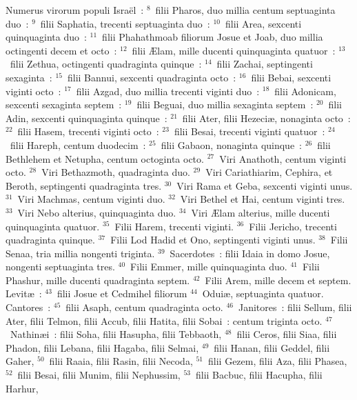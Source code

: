  Numerus virorum populi Isra\"el~:
${}^{8}$~filii Pharos, duo millia centum septuaginta duo~:
${}^{9}$~filii Saphatia, trecenti septuaginta duo~:
${}^{10}$~filii Area, sexcenti quinquaginta duo~:
${}^{11}$~filii Phahathmoab filiorum Josue et Joab, duo millia octingenti decem et octo~:
${}^{12}$~filii \AE lam, mille ducenti quinquaginta quatuor~:
${}^{13}$~filii Zethua, octingenti quadraginta quinque~:
${}^{14}$~filii Zachai, septingenti sexaginta~:
${}^{15}$~filii Bannui, sexcenti quadraginta octo~:
${}^{16}$~filii Bebai, sexcenti viginti octo~:
${}^{17}$~filii Azgad, duo millia trecenti viginti duo~:
${}^{18}$~filii Adonicam, sexcenti sexaginta septem~:
${}^{19}$~filii Beguai, duo millia sexaginta septem~:
${}^{20}$~filii Adin, sexcenti quinquaginta quinque~:
${}^{21}$~filii Ater, filii Hezeci\ae , nonaginta octo~:
${}^{22}$~filii Hasem, trecenti viginti octo~:
${}^{23}$~filii Besai, trecenti viginti quatuor~:
${}^{24}$~filii Hareph, centum duodecim~:
${}^{25}$~filii Gabaon, nonaginta quinque~:
${}^{26}$~filii Bethlehem et Netupha, centum octoginta octo.
${}^{27}$~Viri Anathoth, centum viginti octo.
${}^{28}$~Viri Bethazmoth, quadraginta duo.
${}^{29}$~Viri Cariathiarim, Cephira, et Beroth, septingenti quadraginta tres.
${}^{30}$~Viri Rama et Geba, sexcenti viginti unus.
${}^{31}$~Viri Machmas, centum viginti duo.
${}^{32}$~Viri Bethel et Hai, centum viginti tres.
${}^{33}$~Viri Nebo alterius, quinquaginta duo.
${}^{34}$~Viri \AE lam alterius, mille ducenti quinquaginta quatuor.
${}^{35}$~Filii Harem, trecenti viginti.
${}^{36}$~Filii Jericho, trecenti quadraginta quinque.
${}^{37}$~Filii Lod Hadid et Ono, septingenti viginti unus.
${}^{38}$~Filii Senaa, tria millia nongenti triginta.
${}^{39}$~Sacerdotes~: filii Idaia in domo Josue, nongenti septuaginta tres.
${}^{40}$~Filii Emmer, mille quinquaginta duo.
${}^{41}$~Filii Phashur, mille ducenti quadraginta septem.
${}^{42}$~Filii Arem, mille decem et septem. Levit\ae~:
${}^{43}$~filii Josue et Cedmihel filiorum
${}^{44}$~Odui\ae , septuaginta quatuor. Cantores~:
${}^{45}$~filii Asaph, centum quadraginta octo.
${}^{46}$~Janitores~: filii Sellum, filii Ater, filii Telmon, filii Accub, filii Hatita, filii Sobai~: centum triginta octo.
${}^{47}$~Nathin\ae i~: filii Soha, filii Hasupha, filii Tebbaoth,
${}^{48}$~filii Ceros, filii Siaa, filii Phadon, filii Lebana, filii Hagaba, filii Selmai,
${}^{49}$~filii Hanan, filii Geddel, filii Gaher,
${}^{50}$~filii Raaia, filii Rasin, filii Necoda,
${}^{51}$~filii Gezem, filii Aza, filii Phasea,
${}^{52}$~filii Besai, filii Munim, filii Nephussim,
${}^{53}$~filii Bacbuc, filii Hacupha, filii Harhur,
